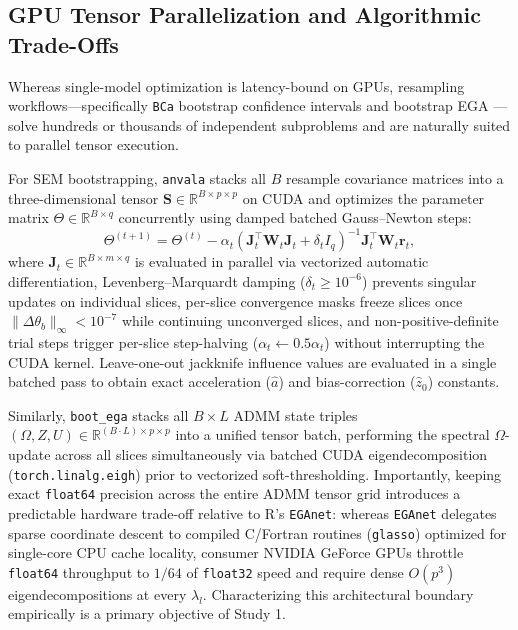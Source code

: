 ﻿\documentclass[12pt,letterpaper]{article}
\begin{document}
\subsection{GPU Tensor Parallelization and Algorithmic Trade-Offs}

Whereas single-model optimization is latency-bound on GPUs, resampling workflows---specifically \texttt{BCa} bootstrap confidence intervals \parencite[\texttt{bootstrap\_ci};][]{efron1987} and bootstrap EGA \parencite[\texttt{boot\_ega};][]{christensen2021}---solve hundreds or thousands of independent subproblems and are naturally suited to parallel tensor execution.

For SEM bootstrapping, \texttt{anvala} stacks all $B$ resample covariance matrices into a three-dimensional tensor $\mathbf{S} \in \mathbb{R}^{B \times p \times p}$ on CUDA and optimizes the parameter matrix $\Theta \in \mathbb{R}^{B \times q}$ concurrently using damped batched Gauss--Newton steps:
\begin{equation}
\Theta^{(t+1)} = \Theta^{(t)} - \alpha_t \left(\mathbf{J}_t^{\top}\mathbf{W}_t\mathbf{J}_t + \delta_t I_q\right)^{-1} \mathbf{J}_t^{\top}\mathbf{W}_t \mathbf{r}_t,
\label{eq:batched_gn}
\end{equation}
where $\mathbf{J}_t \in \mathbb{R}^{B \times m \times q}$ is evaluated in parallel via vectorized automatic differentiation, Levenberg--Marquardt damping ($\delta_t \ge 10^{-6}$) prevents singular updates on individual slices, per-slice convergence masks freeze slices once $\|\Delta\theta_b\|_\infty < 10^{-7}$ while continuing unconverged slices, and non-positive-definite trial steps trigger per-slice step-halving ($\alpha_t \leftarrow 0.5\alpha_t$) without interrupting the CUDA kernel. Leave-one-out jackknife influence values are evaluated in a single batched pass to obtain exact acceleration ($\hat{a}$) and bias-correction ($\hat{z}_0$) constants.

Similarly, \texttt{boot\_ega} stacks all $B \times L$ ADMM state triples $(\Omega, Z, U) \in \mathbb{R}^{(B \cdot L) \times p \times p}$ into a unified tensor batch, performing the spectral $\Omega$-update across all slices simultaneously via batched CUDA eigendecomposition (\texttt{torch.\allowbreak linalg.\allowbreak eigh}) prior to vectorized soft-thresholding. Importantly, keeping exact \texttt{float64} precision across the entire ADMM tensor grid introduces a predictable hardware trade-off relative to R's \texttt{EGAnet}: whereas \texttt{EGAnet} delegates sparse coordinate descent to compiled C/Fortran routines (\texttt{glasso}) optimized for single-core CPU cache locality, consumer NVIDIA GeForce GPUs throttle \texttt{float64} throughput to $1/64$ of \texttt{float32} speed and require dense $O(p^3)$ eigendecompositions at every $\lambda_l$. Characterizing this architectural boundary empirically is a primary objective of Study 1.
\end{document}
